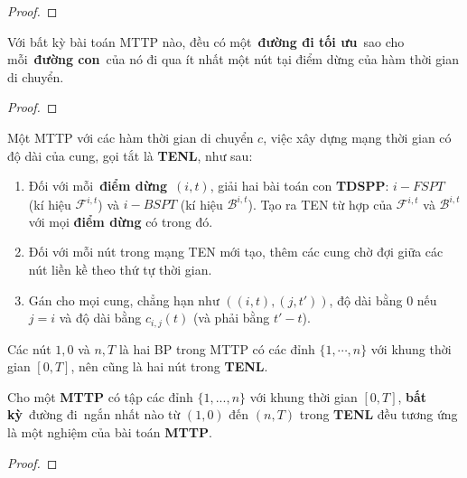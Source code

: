 \documentclass[../main.tex]{subfiles}
\begin{document}
\begin{proof}
\end{proof}

\begin{proposition}
\label{prp:mttp-toi-uu}
Với bất kỳ bài toán MTTP nào, đều có
một~\textbf{đường đi tối ưu}~sao cho mỗi~\textbf{đường con}~của nó đi
qua ít nhất một nút tại điểm dừng của hàm thời gian di chuyển.
\end{proposition}

\begin{proof}
\end{proof}

\begin{definition}
Một MTTP với các hàm thời gian di chuyển \(c\),
việc xây dựng mạng thời gian có độ dài của cung, gọi tắt là
\textbf{TENL}, như sau:

\begin{enumerate}
\def\labelenumi{\arabic{enumi}.}
\tightlist
\item
  Đối với mỗi~\textbf{điểm dừng}~\((i, t)\), giải hai bài toán con
  \textbf{TDSPP}: \(i-FSPT\) (kí hiệu \(\mathcal F^{i,t}\)) và \(i-BSPT\)
  (kí hiệu \(\mathcal B^{i,t}\)). Tạo ra TEN từ hợp của
  \(\mathcal F^{i,t}\) và \(\mathcal B^{i,t}\) với mọi \textbf{điểm
  dừng} có trong đó.
\item
  Đối với mỗi nút trong mạng TEN mới tạo, thêm các cung chờ đợi giữa các
  nút liền kề theo thứ tự thời gian.
\item
  Gán cho mọi cung, chẳng hạn như \(((i, t), (j, t' ))\), độ dài bằng \(0\) nếu \(j = i\) và độ
  dài bằng \(c_{i,j} (t)\) (và phải bằng \(t' − t\)).
\end{enumerate}

\end{definition}

Các nút \(1, 0\) và \(n, T\) là hai BP trong MTTP có các đỉnh \(\{1,\cdots, n\}\) 
với khung thời gian \([0,T]\), nên cũng là hai nút trong \textbf{TENL}.

\begin{corollary}
\label{col:mttp}
Cho một \textbf{MTTP} có tập các đỉnh
\(\{1,...,n\}\) với khung thời gian \([0,T]\), \textbf{bất kỳ}~đường
đi~ngắn nhất nào từ \((1,0)\) đến \((n,T)\) trong \textbf{TENL} đều
tương ứng là một nghiệm của bài toán \textbf{MTTP}.
\end{corollary}

\begin{proof} \end{proof}
\end{document}
